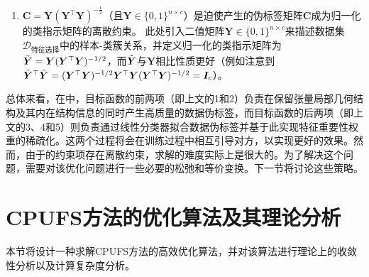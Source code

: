 \begin{enumerate}
    \item $\boldsymbol{C}=\boldsymbol{Y}(\boldsymbol{Y}^{\top} \boldsymbol{Y})^{-\frac{1}{2}}$（且$\boldsymbol{Y}\in\{0,1\}^{n\times c}$）是迫使产生的伪标签矩阵$\boldsymbol{C}$成为归一化的类指示矩阵的离散约束。
    此处引入二值矩阵$\boldsymbol{Y}\in\{0,1\}^{n\times c}$来描述数据集$\mathcal{D}_{\text{特征选择}}$中的样本-类簇关系，并定义归一化的类指示矩阵为$\Tilde{\boldsymbol{Y}}=\boldsymbol{Y}(\boldsymbol{Y}^{\top} \boldsymbol{Y})^{-1/2}$，而$\Tilde{\boldsymbol{Y}}$与$\boldsymbol{Y}$相比性质更好（例如注意到$\Tilde{\boldsymbol{Y}}^{\top} \Tilde{\boldsymbol{Y}}\allowbreak=(\boldsymbol{Y}^{\top} \boldsymbol{Y})^{-1/2} \boldsymbol{Y}^{\top} \boldsymbol{Y}(\boldsymbol{Y}^{\top} \boldsymbol{Y})^{-1/2}=\boldsymbol{I}_{c}$）。
\end{enumerate}

总体来看，在中，目标函数的前两项（即上文的1和2）负责在保留张量局部几何结构及其内在结构信息的同时产生高质量的数据伪标签，而目标函数的后两项（即上文的3、4和5）则负责通过线性分类器拟合数据伪标签并基于此实现特征重要性权重的稀疏化。这两个过程将会在训练过程中相互引导对方，以实现更好的效果。然而，由于的约束项存在离散约束，求解的难度实际上是很大的。为了解决这个问题，需要对该优化问题进行一些必要的松弛和等价变换。下一节将讨论这些策略。



\section{CPUFS方法的优化算法及其理论分析}
本节将设计一种求解CPUFS方法的高效优化算法，并对该算法进行理论上的收敛性分析以及计算复杂度分析。
